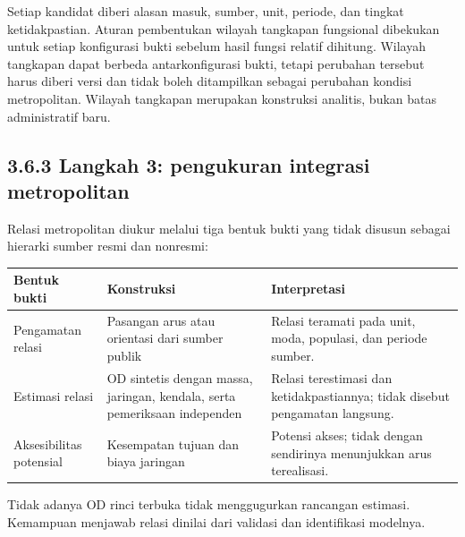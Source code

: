 \documentclass[
  indonesian,
  11pt,
  a4paper,
  oneside,
  openany]{report}
\newcounter{none} %
\begin{document}
Setiap kandidat diberi alasan masuk, sumber, unit, periode, dan tingkat
ketidakpastian. Aturan pembentukan wilayah tangkapan fungsional
dibekukan untuk setiap konfigurasi bukti sebelum hasil fungsi relatif
dihitung. Wilayah tangkapan dapat berbeda antarkonfigurasi bukti, tetapi
perubahan tersebut harus diberi versi dan tidak boleh ditampilkan
sebagai perubahan kondisi metropolitan. Wilayah tangkapan merupakan
konstruksi analitis, bukan batas administratif baru.

\subsection{3.6.3 Langkah 3: pengukuran integrasi
metropolitan}\label{langkah-3-pengukuran-integrasi-metropolitan}

Relasi metropolitan diukur melalui tiga bentuk bukti yang tidak disusun
sebagai hierarki sumber resmi dan nonresmi:

{\def\LTcaptype{none} %
\begin{longtable}[]{@{}
  >{\raggedright\arraybackslash}p{}
  >{\raggedright\arraybackslash}p{}
  >{\raggedright\arraybackslash}p{}@{}}
\toprule\noalign{}
\begin{minipage}[b]{\linewidth}\raggedright
Bentuk bukti
\end{minipage} & \begin{minipage}[b]{\linewidth}\raggedright
Konstruksi
\end{minipage} & \begin{minipage}[b]{\linewidth}\raggedright
Interpretasi
\end{minipage} \\
\midrule\noalign{}
\endhead
\bottomrule\noalign{}
\endlastfoot
Pengamatan relasi & Pasangan arus atau orientasi dari sumber publik &
Relasi teramati pada unit, moda, populasi, dan periode sumber. \\
Estimasi relasi & OD sintetis dengan massa, jaringan, kendala, serta
pemeriksaan independen & Relasi terestimasi dan ketidakpastiannya; tidak
disebut pengamatan langsung. \\
Aksesibilitas potensial & Kesempatan tujuan dan biaya jaringan & Potensi
akses; tidak dengan sendirinya menunjukkan arus terealisasi. \\
\end{longtable}
}

Tidak adanya OD rinci terbuka tidak menggugurkan rancangan estimasi.
Kemampuan menjawab relasi dinilai dari validasi dan identifikasi
modelnya.
\end{document}

